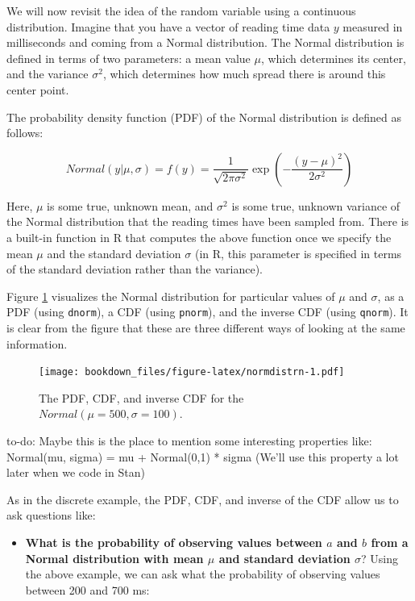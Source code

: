\documentclass[12pt,]{krantz}
\makeatletter
\providecommand{\tightlist}{%
  \setlength{\itemsep}{0pt}\setlength{\parskip}{0pt}}
\newenvironment{kframe}{%
\medskip{}
\setlength{\fboxsep}{.8em}
 \def\at@end@of@kframe{}%
 \ifinner\ifhmode%
  \def\at@end@of@kframe{\end{minipage}}%
  \begin{minipage}{\columnwidth}%
 \fi\fi%
 \def\FrameCommand##1{\hskip\@totalleftmargin \hskip-\fboxsep
 \colorbox{shadecolor}{##1}\hskip-\fboxsep
     \hskip-\linewidth \hskip-\@totalleftmargin \hskip\columnwidth}%
 \MakeFramed {\advance\hsize-\width
   \@totalleftmargin\z@ \linewidth\hsize
   \@setminipage}}%
 {\par\unskip\endMakeFramed%
 \at@end@of@kframe}
\newenvironment{rmdblock}[1]
  {
  \begin{itemize}
  \renewcommand{\labelitemi}{
    \raisebox{-.7\height}[0pt][0pt]{
      {\setkeys{Gin}{width=3em,keepaspectratio}\texttt{[image: images/\#1]}}
    }
  }
  \setlength{\fboxsep}{1em}
  \begin{kframe}
  \item
  }
  {
  \end{kframe}
  \end{itemize}
  }
\newenvironment{rmdnote}
  {\begin{rmdblock}{note}}
  {\end{rmdblock}}
\theoremstyle{definition}
\theoremstyle{definition}
\theoremstyle{definition}
\theoremstyle{remark}
\makeatother
\begin{document}
We will now revisit the idea of the random variable using a continuous distribution. Imagine that you have a vector of reading time data \(y\) measured in milliseconds and coming from a Normal distribution. The Normal distribution is defined in terms of two parameters: a mean value \(\mu\), which determines its center, and the variance \(\sigma^2\), which determines how much spread there is around this center point.

The probability density function (PDF) of the Normal distribution is defined as follows:

\begin{equation}
Normal(y|\mu,\sigma)=f(y)= \frac{1}{\sqrt{2\pi \sigma^2}} \exp \left(-\frac{(y-\mu)^2}{2\sigma^2} \right)
\end{equation}

Here, \(\mu\) is some true, unknown mean, and \(\sigma^2\) is some true, unknown variance of the Normal distribution that the reading times have been sampled from. There is a built-in function in R that computes the above function once we specify the mean \(\mu\) and the standard deviation \(\sigma\) (in R, this parameter is specified in terms of the standard deviation rather than the variance).

Figure \ref{fig:normdistrn} visualizes the Normal distribution for particular values of \(\mu\) and \(\sigma\), as a PDF (using \texttt{dnorm}), a CDF (using \texttt{pnorm}), and the inverse CDF (using \texttt{qnorm}). It is clear from the figure that these are three different ways of looking at the same information.

\begin{figure}
\centering
\texttt{[image: bookdown\_files/figure-latex/normdistrn-1.pdf]}
\caption{\label{fig:normdistrn}The PDF, CDF, and inverse CDF for the \(Normal(\mu=500,\sigma=100)\).}
\end{figure}

\begin{rmdnote}
to-do: Maybe this is the place to mention some interesting properties like:
Normal(mu, sigma) = mu + Normal(0,1) * sigma
(We'll use this property a lot later when we code in Stan)
\end{rmdnote}

As in the discrete example, the PDF, CDF, and inverse of the CDF allow us to ask questions like:

\begin{itemize}
\tightlist
\item
  \textbf{What is the probability of observing values between \(a\) and \(b\) from a Normal distribution with mean \(\mu\) and standard deviation \(\sigma\)}? Using the above example, we can ask what the probability of observing values between 200 and 700 ms:
\end{itemize}
\end{document}
